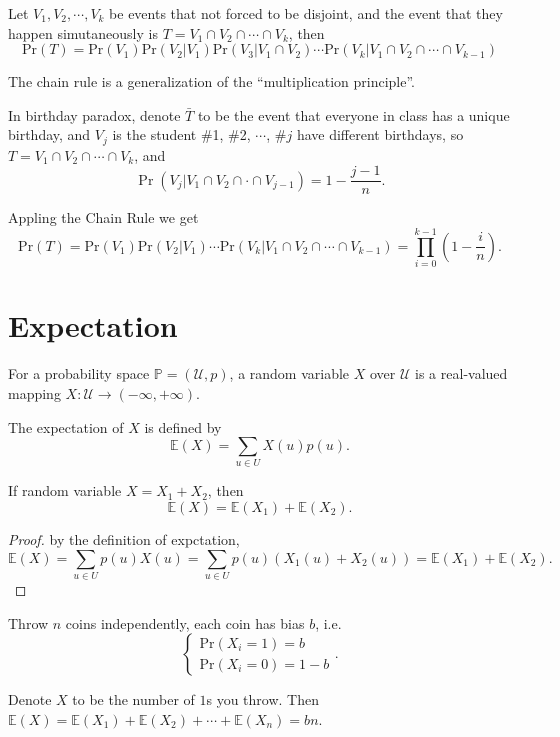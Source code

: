 \documentclass{scribe}
\theoremstyle{plain}
\theoremstyle{empty}
\begin{document}
\begin{theorem}
    Let $V_1, V_2,\cdots, V_k$ be events that not forced to be disjoint, and the event that they happen simutaneously is $T=V_1\cap V_2\cap\cdots\cap V_k$, then
    $$\text{Pr}(T)=\text{Pr}(V_1)\text{Pr}(V_2|V_1)\text{Pr}(V_3|V_1\cap V_2)\cdots\text{Pr}(V_k|V_1\cap V_2\cap \cdots\cap V_{k-1})$$
\end{theorem}

\begin{remark}
    The chain rule is a generalization of the ``multiplication principle''.
\end{remark}

\begin{example}
    In birthday paradox, denote $\bar T$ to be the event that everyone in class has a unique birthday, and $V_j$ is the student \#1, \#2, $\cdots$, \#$j$ have different birthdays, so $T=V_1\cap V_2\cap\cdots\cap V_k$, and
    $$\Pr(V_j|V_1\cap V_2\cap \cdot\cap V_{j-1})=1-\frac{j-1}{n}.$$

    Appling the Chain Rule we get 
    $$\text{Pr}(T)=\text{Pr}(V_1)\text{Pr}(V_2|V_1)\cdots\text{Pr}(V_k|V_1\cap V_2\cap \cdots\cap V_{k-1})=\prod_{i=0}^{k-1}\left(1-\frac{i}{n}\right).$$
\end{example}

\section{Expectation}

\begin{definition}[Expectation]
    For a probability space $\mathbb{P}=(\mathcal{U},p)$, a random variable $X$ over $\mathcal{U}$ is a real-valued mapping $X:\mathcal{U}\to (-\infty,+\infty)$.
    
    The expectation of $X$ is defined by 
    $$\mathbb{E}(X)=\sum_{u\in U}X(u)p(u).$$
\end{definition}

\begin{theorem} If random variable $X=X_1+X_2$, then
    $$\mathbb{E}(X)=\mathbb{E}(X_1)+\mathbb{E}(X_2).$$
\end{theorem}

\begin{proof} by the definition of expctation,
    $$\mathbb{E}(X)=\sum_{u\in U}p(u)X(u)=\sum_{u\in U}p(u)(X_1(u)+X_2(u))=\mathbb{E}(X_1)+\mathbb{E}(X_2).$$
\end{proof}

\begin{example}
    Throw $n$ coins independently, each coin has bias $b$, i.e. 
    $$
    \begin{cases}
    \text{Pr}(X_i=1)=b \\
    \text{Pr}(X_i=0)=1-b
    \end{cases}.
    $$
    
    Denote $X$ to be the number of $1$s you throw. Then $\mathbb{E}(X)=\mathbb{E}(X_1)+\mathbb{E}(X_2)+\cdots+\mathbb{E}(X_n)=bn$.
\end{example}
\end{document}
